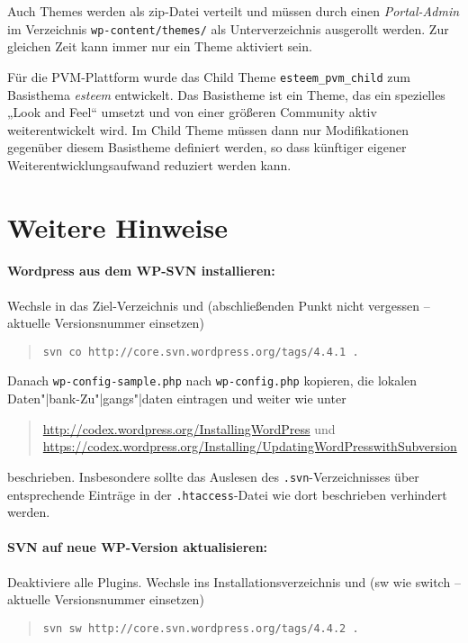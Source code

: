 \documentclass[11pt,a4paper]{article}
\begin{document}
Auch Themes werden als zip-Datei verteilt und müssen durch einen
\emph{Portal-Admin} im Verzeichnis \texttt{wp-content/themes/} als
Unterverzeichnis ausgerollt werden. Zur gleichen Zeit kann immer nur ein Theme
aktiviert sein.

Für die PVM-Plattform wurde das Child Theme \texttt{esteem\_pvm\_child} zum
Basisthema \emph{esteem} entwickelt. Das Basistheme ist ein Theme, das ein
spezielles „Look and Feel“ umsetzt und von einer größeren Community aktiv
weiterentwickelt wird. Im Child Theme müssen dann nur Modifikationen gegenüber
diesem Basistheme definiert werden, so dass künftiger eigener
Weiterentwicklungsaufwand reduziert werden kann.

\section{Weitere Hinweise}

\paragraph{Wordpress aus dem WP-SVN installieren:}

Wechsle in das Ziel-Verzeichnis und (abschließenden Punkt nicht vergessen --
aktuelle Versionsnummer einsetzen)
\begin{quote}
\texttt{svn co http://core.svn.wordpress.org/tags/4.4.1 . }
\end{quote}
Danach \texttt{wp-config-sample.php} nach \texttt{wp-config.php} kopieren, die
lokalen Daten"|bank-Zu"|gangs"|daten eintragen und weiter wie unter
\begin{quote}
{\small\url{http://codex.wordpress.org/InstallingWordPress} und}\\
{\small\url{https://codex.wordpress.org/Installing/UpdatingWordPresswithSubversion}}
\end{quote}
beschrieben. Insbesondere sollte das Auslesen des \texttt{.svn}-Verzeichnisses
über entsprechende Einträge in der \texttt{.htaccess}-Datei wie dort
beschrieben verhindert werden.


\paragraph{SVN auf neue WP-Version aktualisieren:}

Deaktiviere alle Plugins. Wechsle ins Installationsverzeichnis und (sw wie
switch -- aktuelle Versionsnummer einsetzen)
\begin{quote}
\texttt{svn sw http://core.svn.wordpress.org/tags/4.4.2 . }
\end{quote}
\end{document}
